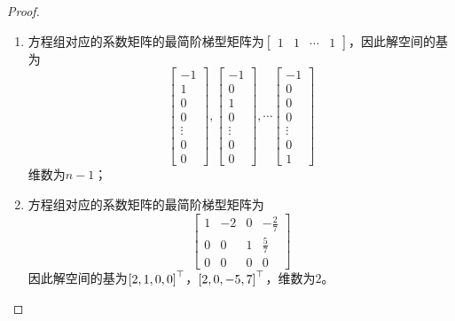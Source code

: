 \begin{proof}
    \begin{enumerate}
        \item {
              方程组对应的系数矩阵的最简阶梯型矩阵为\(\begin{bmatrix}1&1&\cdots&1\end{bmatrix}\)，因此解空间的基为
              \begin{equation*}
                  \begin{bmatrix}-1\\1\\0\\0\\\vdots\\0\\0\end{bmatrix},
                  \begin{bmatrix}-1\\0\\1\\0\\\vdots\\0\\0\end{bmatrix},\cdots
                  \begin{bmatrix}-1\\0\\0\\0\\\vdots\\0\\1\end{bmatrix}
              \end{equation*}
              维数为\(n-1\)；
              }
        \item {
              方程组对应的系数矩阵的最简阶梯型矩阵为
              \begin{equation*}
                  \begin{bmatrix}
                      1 & -2 & 0 & -\frac{2}{7} \\
                      0 & 0  & 1 & \frac{5}{7}  \\
                      0 & 0  & 0 & 0
                  \end{bmatrix}
              \end{equation*}
              因此解空间的基为\(\left[ 2,1,0,0 \right]^\top\)，\(\left[ 2,0,-5,7 \right]^\top\)，维数为\(2\)。
              }
    \end{enumerate}
\end{proof}

